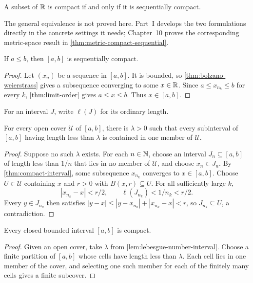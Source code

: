 \begin{theorem}
\label{thm:real-compact-sequential}
A subset of $\mathbb{R}$ is compact if and only if it is sequentially compact.
\end{theorem}
The general equivalence is not proved here. Part~I develops the two
formulations directly in the concrete settings it needs; Chapter~10 proves
the corresponding metric-space result in
\cref{thm:metric-compact-sequential}.

\begin{theorem}
\label{thm:compact-interval}
If $a\leq b$, then $[a,b]$ is sequentially compact.
\end{theorem}
\begin{proof}
Let $(x_n)$ be a sequence in $[a,b]$. It is bounded, so \cref{thm:bolzano-weierstrass} gives a subsequence converging to some $x\in\mathbb{R}$. Since $a\leq x_{n_k}\leq b$ for every $k$, \cref{thm:limit-order} gives $a\leq x\leq b$. Thus $x\in[a,b]$.
\end{proof}

For an interval $J$, write $\ell(J)$ for its ordinary length.

\begin{lemma}
\label{lem:lebesgue-number-interval}
For every open cover $\mathcal U$ of $[a,b]$, there is $\lambda>0$ such
that every subinterval of $[a,b]$ having length less than $\lambda$ is
contained in one member of $\mathcal U$.
\end{lemma}
\begin{proof}
Suppose no such $\lambda$ exists. For each $n\in\mathbb{N}$, choose an interval
$J_n\subseteq[a,b]$ of length less than $1/n$ that lies in no member of
$\mathcal U$, and choose $x_n\in J_n$. By
\cref{thm:compact-interval}, some subsequence $x_{n_k}$ converges to
$x\in[a,b]$. Choose $U\in\mathcal U$ containing $x$ and $r>0$ with
$B(x,r)\subseteq U$. For all sufficiently large $k$,
\[
|x_{n_k}-x|<r/2,
\qquad
\ell(J_{n_k})<1/n_k<r/2.
\]
Every $y\in J_{n_k}$ then satisfies
$|y-x|\leq|y-x_{n_k}|+|x_{n_k}-x|<r$, so $J_{n_k}\subseteq U$, a
contradiction.
\end{proof}

\begin{theorem}
\label{thm:compact-closed-interval}
Every closed bounded interval $[a,b]$ is compact.
\end{theorem}
\begin{proof}
Given an open cover, take $\lambda$ from
\cref{lem:lebesgue-number-interval}. Choose a finite partition of
$[a,b]$ whose cells have length less than $\lambda$. Each cell lies in one
member of the cover, and selecting one such member for each of the finitely
many cells gives a finite subcover.
\end{proof}

